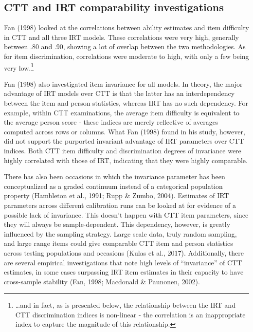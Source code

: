 \documentclass[
  man]{apa6}
\begin{document}
\hypertarget{ctt-and-irt-comparability-investigations}{%
\subsection{CTT and IRT comparability investigations}\label{ctt-and-irt-comparability-investigations}}

Fan (1998) looked at the correlations between ability estimates and item difficulty in CTT and all three IRT models. These correlations were very high, generally between .80 and .90, showing a lot of overlap between the two methodologies. As for item discrimination, correlations were moderate to high, with only a few being very low.\footnote{\ldots and in fact, as is presented below, the relationship between the IRT and CTT discrimination indices is non-linear - the correlation is an inappropriate index to capture the magnitude of this relationship.}

Fan (1998) also investigated item invariance for all models. In theory, the major advantage of IRT models over CTT is that the latter has an interdependency between the item and person statistics, whereas IRT has no such dependency. For example, within CTT examinations, the average item difficulty is equivalent to the average person score - these indices are merely reflective of averages computed across rows or columns. What Fan (1998) found in his study, however, did not support the purported invariant advantage of IRT parameters over CTT indices. Both CTT item difficulty and discrimination degrees of invariance were highly correlated with those of IRT, indicating that they were highly comparable.

There has also been occasions in which the invariance parameter has been conceptualized as a graded continuum instead of a categorical population property (Hambleton et al., 1991; Rupp \& Zumbo, 2004). Estimates of IRT parameters across different calibration runs can be looked at for evidence of a possible lack of invariance. This doesn't happen with CTT item parameters, since they will always be sample-dependent. This dependency, however, is greatly influenced by the sampling strategy. Large scale data, truly random sampling, and large range items could give comparable CTT item and person statistics across testing populations and occasions (Kulas et al., 2017). Additionally, there are several empirical investigations that note high levels of ``invariance'' of CTT estimates, in some cases surpassing IRT item estimates in their capacity to have cross-sample stability (Fan, 1998; Macdonald \& Paunonen, 2002).
\end{document}
